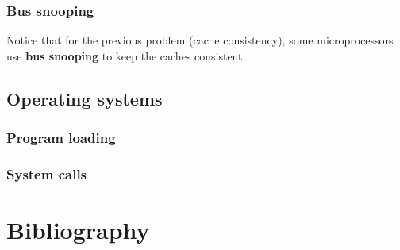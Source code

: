 
\begin{frame}
  \frametitle{Bus snooping}

  Notice that for the previous problem (cache consistency), some
  microprocessors use \textbf{bus snooping} to keep the caches
  consistent.

\end{frame}

%
%

\subsection{Operating systems}


\begin{frame}
  \frametitle{Program loading}

  \begin{center}
  \end{center}

\end{frame}


\begin{frame}
  \frametitle{System calls}

  \begin{center}
  \end{center}

\end{frame}

%
%

\section{Bibliography}

\begin{thebibliography}{4}


\end{thebibliography}


